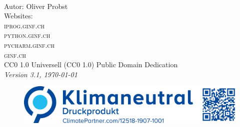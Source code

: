 
\newpage
~\vfill
\thispagestyle{empty}

\noindent Autor: Oliver Probst\\

\noindent Websites:\\
\noindent \textsc{iprog.ginf.ch}\\
\noindent \textsc{python.ginf.ch}\\
\noindent \textsc{pycharm.ginf.ch}\\
\noindent \textsc{ginf.ch}\\

\noindent \ccLogo \hspace{0.1cm} \ccZero \hspace{0.1cm} CC0 1.0 Universell (CC0 1.0) Public Domain Dedication \\

\noindent \textit{Version 3.1, \today}

\begin{figure}[htb]
\includegraphics[scale=0.15]{climate}
\end{figure}
